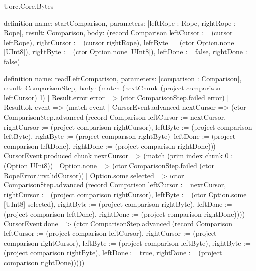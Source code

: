 \begin{lexlean}{Uorc.Core.Bytes}
\begin{semanticmodule}
definition{
  name: startComparison,
  parameters: [leftRope : Rope, rightRope : Rope],
  result: Comparison,
  body: (record Comparison {leftCursor := (cursor leftRope), rightCursor := (cursor rightRope), leftByte := (ctor Option.none [UInt8]), rightByte := (ctor Option.none [UInt8]), leftDone := false, rightDone := false})
}

definition{
  name: readLeftComparison,
  parameters: [comparison : Comparison],
  result: ComparisonStep,
  body: (match (nextChunk (project comparison leftCursor) 1)
    | Result.error error => (ctor ComparisonStep.failed error)
    | Result.ok event => (match event
      | CursorEvent.advanced nextCursor => (ctor ComparisonStep.advanced (record Comparison {leftCursor := nextCursor, rightCursor := (project comparison rightCursor), leftByte := (project comparison leftByte), rightByte := (project comparison rightByte), leftDone := (project comparison leftDone), rightDone := (project comparison rightDone)}))
      | CursorEvent.produced chunk nextCursor => (match (prim index chunk 0 : (Option UInt8))
        | Option.none => (ctor ComparisonStep.failed (ctor RopeError.invalidCursor))
        | Option.some selected => (ctor ComparisonStep.advanced (record Comparison {leftCursor := nextCursor, rightCursor := (project comparison rightCursor), leftByte := (ctor Option.some [UInt8] selected), rightByte := (project comparison rightByte), leftDone := (project comparison leftDone), rightDone := (project comparison rightDone)})))
      | CursorEvent.done => (ctor ComparisonStep.advanced (record Comparison {leftCursor := (project comparison leftCursor), rightCursor := (project comparison rightCursor), leftByte := (project comparison leftByte), rightByte := (project comparison rightByte), leftDone := true, rightDone := (project comparison rightDone)}))))
}


\end{semanticmodule}
\end{lexlean}
